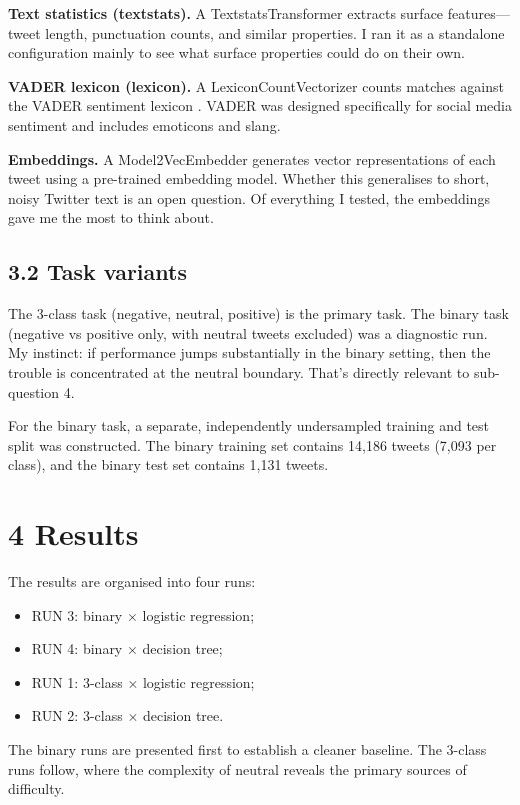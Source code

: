 \documentclass[12pt]{article}
\begin{document}
\textbf{Text statistics (textstats).} A TextstatsTransformer extracts surface features---tweet length, punctuation counts, and similar properties. I ran it as a standalone configuration mainly to see what surface properties could do on their own.

\textbf{VADER lexicon (lexicon).} A LexiconCountVectorizer counts matches against the VADER sentiment lexicon \citep{hutto2014vader}. VADER was designed specifically for social media sentiment and includes emoticons and slang.

\textbf{Embeddings.} A Model2VecEmbedder generates vector representations of each tweet using a pre-trained embedding model. Whether this generalises to short, noisy Twitter text is an open question. Of everything I tested, the embeddings gave me the most to think about.



\subsection*{3.2 Task variants}



The 3-class task (negative, neutral, positive) is the primary task. The binary task (negative vs positive only, with neutral tweets excluded) was a diagnostic run. My instinct: if performance jumps substantially in the binary setting, then the trouble is concentrated at the neutral boundary. That's directly relevant to sub-question 4.

For the binary task, a separate, independently undersampled training and test split was constructed. The binary training set contains 14,186 tweets (7,093 per class), and the binary test set contains 1,131 tweets.



\section*{4 Results}



The results are organised into four runs:

\begin{itemize}

  \item RUN 3: binary $\times$ logistic regression;

  \item RUN 4: binary $\times$ decision tree;

  \item RUN 1: 3-class $\times$ logistic regression;

  \item RUN 2: 3-class $\times$ decision tree.

\end{itemize} The binary runs are presented first to establish a cleaner baseline. The 3-class runs follow, where the complexity of neutral reveals the primary sources of difficulty.
\end{document}
